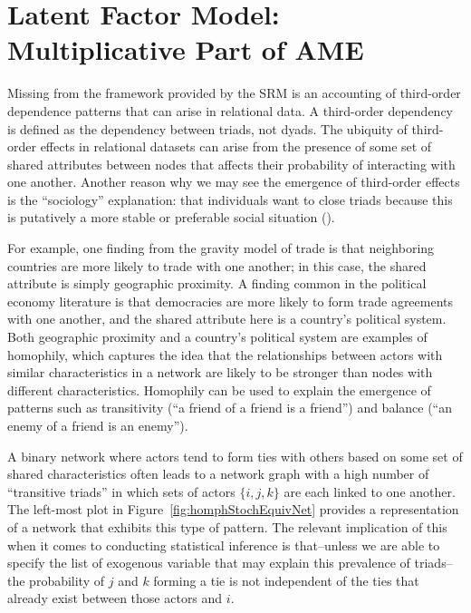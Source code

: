 \documentclass[12pt,pdflatex]{elsarticle}
\begin{document}
\section*{Latent Factor Model: Multiplicative Part of AME}

Missing from the framework provided by the SRM is an accounting of third-order dependence patterns that can arise in relational data. A third-order dependency is defined as the dependency between triads, not dyads. The ubiquity of third-order effects in relational datasets can arise from the presence of some set of shared attributes between nodes that affects their probability of interacting with one another. Another reason why we may see the emergence of third-order effects is the ``sociology'' explanation: that individuals want to close triads because this is putatively a more stable or preferable social situation (\citealt{wasserman:faust:1994}).

For example, one finding from the gravity model of trade is that neighboring countries are more likely to trade with one another; in this case, the shared attribute is simply geographic proximity. A finding common in the political economy literature is that democracies are more likely to form trade agreements with one another, and the shared attribute here is a country's political system. Both geographic proximity and a country's political system are examples of homophily, which captures the idea that the relationships between actors with similar characteristics in a network are likely to be stronger than nodes with different characteristics. Homophily can be used to explain the emergence of patterns such as transitivity (``a friend of a friend is a friend'') and balance (``an enemy of a friend is an enemy''). 

A binary network where actors tend to form ties with others based on some set of shared characteristics often leads to a network graph with a high number of ``transitive triads'' in which  sets of actors $\{i,j,k\}$ are each linked to one another. The left-most plot in Figure~\ref{fig:homphStochEquivNet} provides a representation of a network that exhibits this type of pattern. The relevant implication of this when it comes to conducting statistical inference is that--unless we are able to specify the list of exogenous variable that may explain this prevalence of triads--the probability of $j$ and $k$ forming a tie is not independent of the ties that already exist between those actors and $i$.
\end{document}
